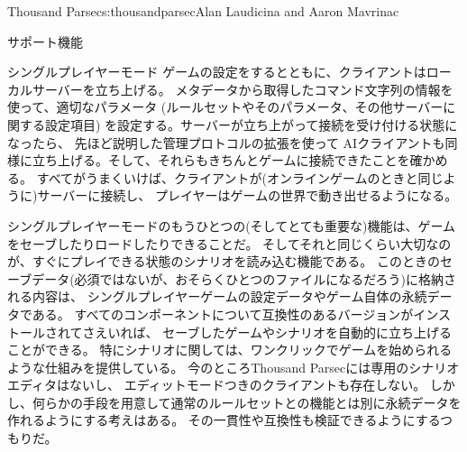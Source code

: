 \begin{aosachapter}{Thousand Parsec}{s:thousandparsec}{Alan Laudicina and Aaron Mavrinac}
\begin{aosasect1}{サポート機能}
\begin{aosasect2}{シングルプレイヤーモード}
ゲームの設定をするとともに、クライアントはローカルサーバーを立ち上げる。
メタデータから取得したコマンド文字列の情報を使って、適切なパラメータ
(ルールセットやそのパラメータ、その他サーバーに関する設定項目)
を設定する。サーバーが立ち上がって接続を受け付ける状態になったら、
先ほど説明した管理プロトコルの拡張を使って
AIクライアントも同様に立ち上げる。そして、それらもきちんとゲームに接続できたことを確かめる。
すべてがうまくいけば、クライアントが(オンラインゲームのときと同じように)サーバーに接続し、
プレイヤーはゲームの世界で動き出せるようになる。

シングルプレイヤーモードのもうひとつの(そしてとても重要な)機能は、ゲームをセーブしたりロードしたりできることだ。
そしてそれと同じくらい大切なのが、すぐにプレイできる状態のシナリオを読み込む機能である。
このときのセーブデータ(必須ではないが、おそらくひとつのファイルになるだろう)に格納される内容は、
シングルプレイヤーゲームの設定データやゲーム自体の永続データである。
すべてのコンポーネントについて互換性のあるバージョンがインストールされてさえいれば、
セーブしたゲームやシナリオを自動的に立ち上げることができる。
特にシナリオに関しては、ワンクリックでゲームを始められるような仕組みを提供している。
今のところThousand Parsecには専用のシナリオエディタはないし、
エディットモードつきのクライアントも存在しない。
しかし、何らかの手段を用意して通常のルールセットとの機能とは別に永続データを作れるようにする考えはある。
その一貫性や互換性も検証できるようにするつもりだ。


\end{aosasect2}
\end{aosasect1}
\end{aosachapter}
